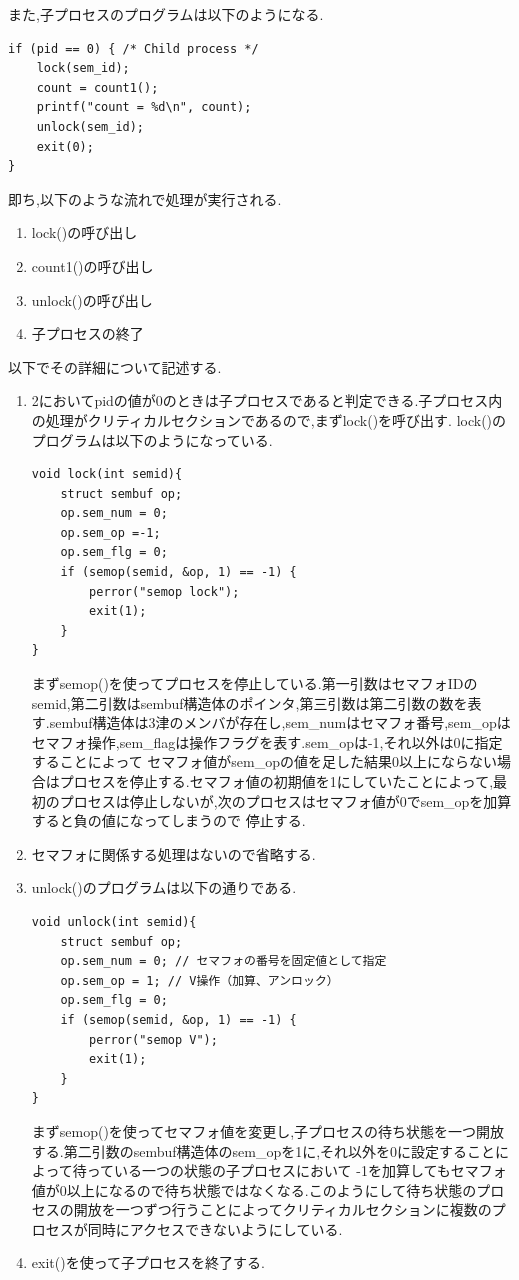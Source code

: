 \documentclass[dvipdfmx]{jarticle}
\begin{document}
また,子プロセスのプログラムは以下のようになる.
\begin{lstlisting}
if (pid == 0) { /* Child process */
    lock(sem_id);
    count = count1();
    printf("count = %d\n", count);
    unlock(sem_id);
    exit(0);
}
\end{lstlisting}
即ち,以下のような流れで処理が実行される.
\begin{enumerate}
    \item lock()の呼び出し
    \item count1()の呼び出し
    \item unlock()の呼び出し
    \item 子プロセスの終了
\end{enumerate}
以下でその詳細について記述する.
\begin{enumerate}
    \item 2においてpidの値が0のときは子プロセスであると判定できる.子プロセス内の処理がクリティカルセクションであるので,まずlock()を呼び出す.
    lock()のプログラムは以下のようになっている.
    \begin{lstlisting}
void lock(int semid){
    struct sembuf op;
    op.sem_num = 0;
    op.sem_op =-1;
    op.sem_flg = 0;
    if (semop(semid, &op, 1) == -1) {
        perror("semop lock");
        exit(1);
    }
}
    \end{lstlisting}
    まずsemop()を使ってプロセスを停止している.第一引数はセマフォIDのsemid,第二引数はsembuf構造体のポインタ,第三引数は第二引数の数を表す.sembuf構造体は3津のメンバが存在し,sem\_numはセマフォ番号,sem\_opはセマフォ操作,sem\_flagは操作フラグを表す.\cite{4}sem\_opは-1,それ以外は0に指定することによって
    セマフォ値がsem\_opの値を足した結果0以上にならない場合はプロセスを停止する.セマフォ値の初期値を1にしていたことによって,最初のプロセスは停止しないが,次のプロセスはセマフォ値が0でsem\_opを加算すると負の値になってしまうので
    停止する.
    \item セマフォに関係する処理はないので省略する.
    \item unlock()のプログラムは以下の通りである.
    \begin{lstlisting}
void unlock(int semid){
    struct sembuf op;
    op.sem_num = 0; // セマフォの番号を固定値として指定
    op.sem_op = 1; // V操作（加算、アンロック）
    op.sem_flg = 0;
    if (semop(semid, &op, 1) == -1) {
        perror("semop V");
        exit(1);
    }
}
    \end{lstlisting}
    まずsemop()を使ってセマフォ値を変更し,子プロセスの待ち状態を一つ開放する.第二引数のsembuf構造体のsem\_opを1に,それ以外を0に設定することによって待っている一つの状態の子プロセスにおいて
    -1を加算してもセマフォ値が0以上になるので待ち状態ではなくなる.このようにして待ち状態のプロセスの開放を一つずつ行うことによってクリティカルセクションに複数のプロセスが同時にアクセスできないようにしている.
    \item exit()を使って子プロセスを終了する.
\end{enumerate}
\end{document}
